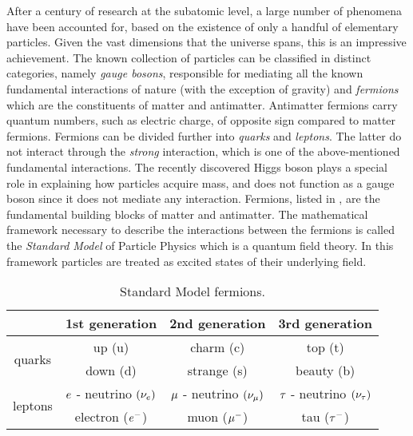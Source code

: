 After a century of research at the subatomic level, a large number of phenomena have been accounted
for, based on the existence of only a handful of elementary particles. Given the vast dimensions that the
universe spans, this is an impressive achievement. The known collection of particles can be classified
in distinct categories, namely {\it gauge bosons}, responsible for mediating all the known fundamental
interactions of nature (with the exception of gravity) and {\it fermions} which are the constituents
of matter and antimatter. Antimatter fermions carry quantum numbers, such as electric charge, of opposite
sign compared to matter fermions. Fermions can be divided further into {\it quarks}
and {\it leptons}. The latter do not interact through the {\it strong} interaction, which is
one of the above-mentioned fundamental interactions. The recently discovered Higgs
boson \cite{higgs-cms,higgs-atlas} plays a special role in explaining how particles acquire mass,
and does not function as a gauge boson since it does not mediate any interaction. Fermions,
listed in , are the fundamental building blocks of matter and antimatter.
The mathematical framework necessary to describe the interactions between the fermions is called the
\textit{Standard Model} of Particle Physics \cite{sm-glashow,sm-weinberg,sm-salam} which is a quantum
field theory. In this framework particles are treated as excited states of their underlying field.


\begin{table}[h!]
  \centering
 \begin{tabular}{cccc}
   \hline
                            &  1st generation                     &   2nd generation              &  3rd generation    \\
   \hline
   \multirow{2}{*}{quarks}  &  up (u)                             &   charm (c)                   &  top (t)           \\
                            &  down (d)                           &   strange (s)                 &  beauty (b)        \\
   \hline
   \multirow{2}{*}{leptons} &   $e$ - neutrino $(\nu_e)$  &  $\mu$ - neutrino $(\nu_\mu)$  &  $\tau$ - neutrino $(\nu_\tau)$  \\
                            &   electron ($e^-$)                  &   muon ($\mu^-$)               &  tau ($\tau^-$)     \\
   \hline
 \end{tabular}
 \caption{Standard Model fermions.}
 \label{quarksLeptons}
\end{table}

